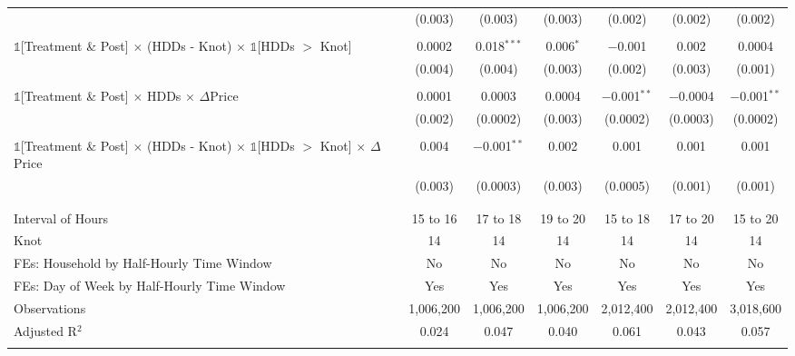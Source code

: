 \begin{table}[!htbp]
\begin{longtable}{@{\extracolsep{15pt}}lcccccc}
  & (0.003) & (0.003) & (0.003) & (0.002) & (0.002) & (0.002) \\ 
  & & & & & & \\ 
 $\mathbb{1}$[Treatment \& Post] $\times$ (HDDs - Knot) $\times$ $\mathbb{1}$[HDDs $>$ Knot] & 0.0002 & 0.018$^{***}$ & 0.006$^{*}$ & $-$0.001 & 0.002 & 0.0004 \\ 
  & (0.004) & (0.004) & (0.003) & (0.002) & (0.003) & (0.001) \\ 
  & & & & & & \\ 
 $\mathbb{1}$[Treatment \& Post] $\times$ HDDs $\times$ $\Delta$Price & 0.0001 & 0.0003 & 0.0004 & $-$0.001$^{**}$ & $-$0.0004 & $-$0.001$^{**}$ \\ 
  & (0.002) & (0.0002) & (0.003) & (0.0002) & (0.0003) & (0.0002) \\ 
  & & & & & & \\ 
 $\mathbb{1}$[Treatment \& Post] $\times$ (HDDs - Knot) $\times$ $\mathbb{1}$[HDDs $>$ Knot] $\times$ $\Delta$Price & 0.004 & $-$0.001$^{**}$ & 0.002 & 0.001 & 0.001 & 0.001 \\ 
  & (0.003) & (0.0003) & (0.003) & (0.0005) & (0.001) & (0.001) \\ 
  & & & & & & \\ 
\hline \\[-1.8ex] 
Interval of Hours & 15 to 16 & 17 to 18 & 19 to 20 & 15 to 18 & 17 to 20 & 15 to 20 \\ 
Knot & 14 & 14 & 14 & 14 & 14 & 14 \\ 
FEs: Household by Half-Hourly Time Window & No & No & No & No & No & No \\ 
FEs: Day of Week by Half-Hourly Time Window & Yes & Yes & Yes & Yes & Yes & Yes \\ 
Observations & 1,006,200 & 1,006,200 & 1,006,200 & 2,012,400 & 2,012,400 & 3,018,600 \\ 
Adjusted R$^{2}$ & 0.024 & 0.047 & 0.040 & 0.061 & 0.043 & 0.057 \\ 
\hline 
\hline \\[-1.8ex] 
\end{longtable} 
\end{table} 
